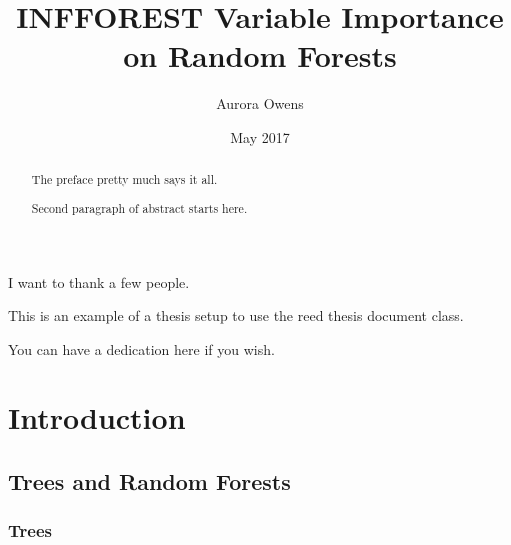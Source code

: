 \documentclass[12pt,twoside]{reedthesis}
\title{INFFOREST Variable Importance on Random Forests}
\author{Aurora Owens}
\date{May 2017}
\begin{document}
      \maketitle
  
  \frontmatter %
  \pagestyle{empty} %

      \begin{acknowledgements}
      I want to thank a few people.
    \end{acknowledgements}
  
      \begin{preface}
      This is an example of a thesis setup to use the reed thesis document
      class.
    \end{preface}
  
      \hypersetup{linkcolor=black}
    \setcounter{tocdepth}{2}
    \tableofcontents
  
      \listoftables
  
      \listoffigures
  
      \begin{abstract}
      The preface pretty much says it all. \par  Second paragraph of abstract
      starts here.
    \end{abstract}
  
      \begin{dedication}
      You can have a dedication here if you wish.
    \end{dedication}
  
  \mainmatter %
  \pagestyle{fancyplain} %

  \chapter{Introduction}\label{introduction}
  
  \section{Trees and Random Forests}\label{trees-and-random-forests}
  
  \subsection{Trees}\label{trees}
  
\end{document}
